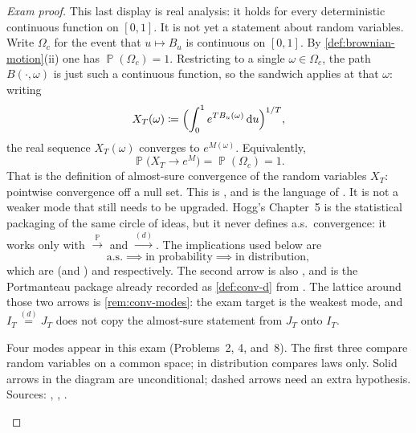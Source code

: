 \documentclass[11pt,a4paper]{article}
\DeclareMathOperator{\Pbb}{\mathbb{P}}
\begin{document}
\begin{proof}[Exam proof]
This last display is real analysis: it holds for every deterministic continuous function on \([0,1]\). It is not yet a statement about random variables. Write \(\Omega_c\) for the event that \(u\mapsto B_u\) is continuous on \([0,1]\). By \cref{def:brownian-motion}(ii) one has \(\Pbb(\Omega_c)=1\). Restricting to a single \(\omega\in\Omega_c\), the path \(B(\cdot,\omega)\) is just such a continuous function, so the sandwich applies at that \(\omega\): writing
\[
X_T(\omega)
\coloneqq
\Bigl(\int_0^1 e^{T B_u(\omega)}\,\mathrm{d}u\Bigr)^{1/T},
\]
the real sequence \(X_T(\omega)\) converges to \(e^{M(\omega)}\). Equivalently,
\[
\Pbb\bigl(X_T\to e^{M}\bigr)
=
\Pbb(\Omega_c)
=
1.
\]
That is the definition of almost-sure convergence of the random variables \(X_T\): pointwise convergence off a null set. This is \citep[Definition~5.4.1]{ren2024}, and is the language of \citep[\S2.3]{durrett2010}. It is not a weaker mode that still needs to be upgraded. Hogg's Chapter~5 is the statistical packaging of the same circle of ideas, but it never defines a.s.\ convergence: it works only with \(\xrightarrow{\Pbb}\) and \(\xrightarrow{(d)}\). The implications used below are
\[
\text{a.s.}
\implies
\text{in probability}
\implies
\text{in distribution},
\]
which are \citep[Proposition~5.4.3]{ren2024} (and \citep[\S2.3]{durrett2010}) and \citep[Proposition~9.2.1]{ren2024} respectively. The second arrow is also \citep[Theorem~5.2.1]{hogg2019}, and is the Portmanteau package already recorded as \cref{def:conv-d} from \citep[Theorems~3.2.3 and~3.2.5]{durrett2010}. The lattice around those two arrows is \cref{rem:conv-modes}: the exam target is the weakest mode, and \(I_T\stackrel{(d)}{=}J_T\) does not copy the almost-sure statement from \(J_T\) onto \(I_T\).

\begin{remark}
\label{rem:conv-modes}
Four modes appear in this exam (Problems~2, 4, and~8). The first three compare random variables on a common space; in distribution compares laws only. Solid arrows in the diagram are unconditional; dashed arrows need an extra hypothesis. Sources: \citep[\S2.3, Theorems~3.2.3 and~3.2.5]{durrett2010}, \citep[\S5.1--5.2]{hogg2019}, \citep[Definitions~5.4.1--5.4.2, Propositions~5.4.3, 9.2.1, 9.2.2]{ren2024}.


\end{remark}
\end{proof}
\end{document}
